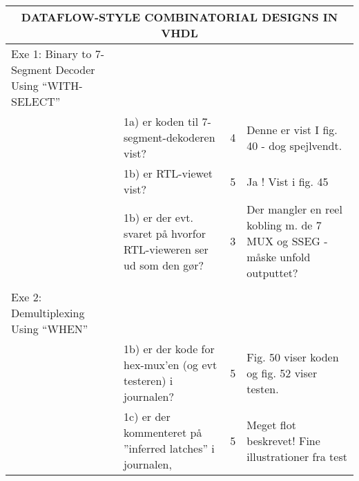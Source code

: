 \begin{table}[h]
    \small
    \begin{tabularx}{\textwidth}{p{3.5cm}Xp{5mm}X}

        \toprule
        \multicolumn{4}{c}{DATAFLOW-STYLE COMBINATORIAL DESIGNS IN VHDL}                                                                                                                                                                        \\\midrule
        Exe 1: Binary to 7-Segment Decoder Using “WITH-SELECT” &                                                                                                &   &                                                                           \\
                                                               & 1a) er koden til 7-segment-dekoderen vist?                                                     & 4 & Denne er vist I fig. 40 - dog spejlvendt.                                 \\
                                                               & 1b) er RTL-viewet vist?                                                                        & 5 & Ja ! Vist i fig. 45                                                       \\
                                                               & 1b) er der evt. svaret på hvorfor RTL-vieweren ser ud som den gør?                             & 3 & Der mangler en reel kobling m. de 7 MUX og SSEG - måske unfold outputtet? \\
                                                               &                                                                                                &   &                                                                           \\\midrule
        Exe 2: Demultiplexing Using “WHEN”                     &                                                                                                &   &                                                                           \\
                                                               & 1b) er der kode for hex-mux’en (og evt testeren) i journalen?                                  & 5 & Fig. 50 viser koden og fig. 52 viser testen.                              \\
                                                               & 1c) er der kommenteret på ”inferred latches” i journalen,                                      & 5 & Meget flot beskrevet! Fine illustrationer fra test                        \\

\end{tabularx}
\end{table}
